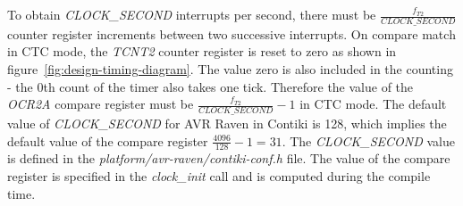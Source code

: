 To obtain {\it{CLOCK\_SECOND}} interrupts per second, there must be
${\frac{f_{T2}}{CLOCK\_SECOND}}$ counter register increments between two successive interrupts.
On compare match in CTC mode, the {\it{TCNT2}} counter register is reset to zero as
shown in figure~\ref{fig:design-timing-diagram}.
The value zero is also included in the counting - the 0th count of the timer also takes one tick.
Therefore the value of the {\it{OCR2A}} compare register must be ${\frac{f_{T2}}{CLOCK\_SECOND}} - 1$ in CTC mode.
The default value of {\it{CLOCK\_SECOND}} for AVR Raven in Contiki is 128,
which implies the default value of the compare register ${\frac{4096}{128}} - 1 = 31$.
The {\it{CLOCK\_SECOND}} value is defined in the {\it{platform/avr-raven/contiki-conf.h}} file.
The value of the compare register is specified in the {\it{clock\_init}} call
and is computed during the compile time.
